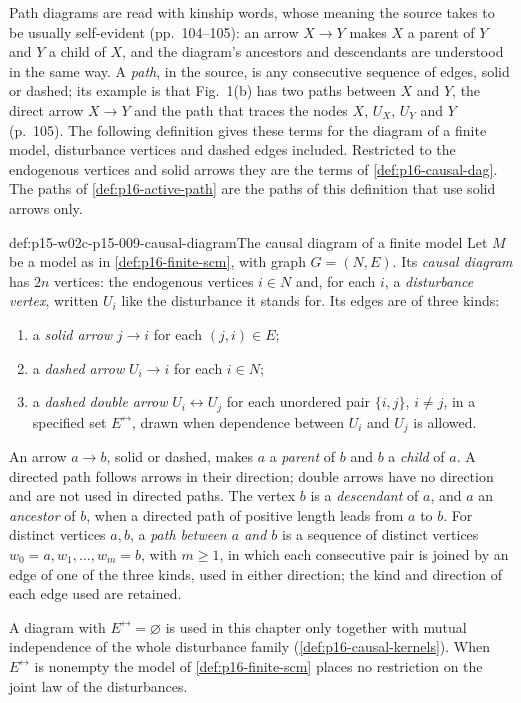 Path diagrams are read with kinship words, whose meaning the source
takes to be usually self-evident (pp.~104--105): an arrow \(X\to Y\)
makes \(X\) a parent of \(Y\) and \(Y\) a child of \(X\), and the
diagram's ancestors and descendants are understood in the same way. A
\emph{path}, in the source, is any consecutive sequence of edges, solid or
dashed; its example is that Fig.~1(b) has two paths between \(X\) and
\(Y\), the direct arrow \(X\to Y\) and the path that traces the nodes
\(X\), \(U_X\), \(U_Y\) and \(Y\) (p.~105). The following definition
gives these terms for the diagram of a finite model, disturbance vertices
and dashed edges included. Restricted to the endogenous vertices and
solid arrows they are the terms of \cref{def:p16-causal-dag}. The paths
of \cref{def:p16-active-path} are the paths of this definition that use
solid arrows only.

\begin{hbdefinition}{def:p15-w02c-p15-009-causal-diagram}{The causal diagram of a finite model}
Let \(M\) be a model as in \cref{def:p16-finite-scm}, with graph
\(G=(N,E)\). Its \emph{causal diagram} has \(2n\) vertices: the
endogenous vertices \(i\in N\) and, for each \(i\), a \emph{disturbance
vertex}, written \(U_i\) like the disturbance it stands for. Its edges are
of three kinds:
\begin{enumerate}
\item a \emph{solid arrow} \(j\to i\) for each \((j,i)\in E\);
\item a \emph{dashed arrow} \(U_i\to i\) for each \(i\in N\);
\item a \emph{dashed double arrow} \(U_i\leftrightarrow U_j\) for each
      unordered pair \(\{i,j\}\), \(i\ne j\), in a specified set
      \(E^{\leftrightarrow}\), drawn when dependence between \(U_i\) and
      \(U_j\) is allowed.
\end{enumerate}
An arrow \(a\to b\), solid or dashed, makes \(a\) a \emph{parent} of
\(b\) and \(b\) a \emph{child} of \(a\). A directed path follows arrows
in their direction; double arrows have no direction and are not used in
directed paths. The vertex \(b\) is a \emph{descendant} of \(a\), and
\(a\) an \emph{ancestor} of \(b\), when a directed path of positive length
leads from \(a\) to \(b\). For distinct vertices \(a,b\), a \emph{path
between \(a\) and \(b\)} is a sequence of distinct vertices
\(w_0=a,w_1,\ldots,w_m=b\), with \(m\geq1\), in which each consecutive
pair is joined by an edge of one of the three kinds, used in either
direction; the kind and direction of each edge used are retained.

A diagram with \(E^{\leftrightarrow}=\varnothing\) is used in this
chapter only together with mutual independence of the whole disturbance
family (\cref{def:p16-causal-kernels}). When \(E^{\leftrightarrow}\) is
nonempty the model of \cref{def:p16-finite-scm} places no restriction on
the joint law of the disturbances.
\end{hbdefinition}


